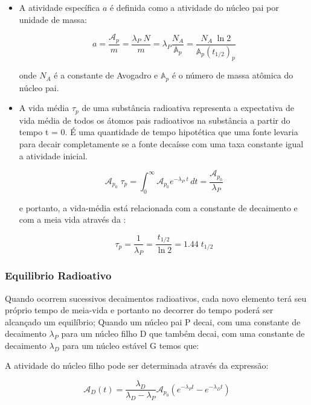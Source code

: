 \documentclass[11pt,a4paper]{article}
\begin{document}
\begin{itemize}
		\item A atividade específica $a$ é definida como a atividade do núcleo pai por unidade de massa:
		
			\begin{equation}
				a = \frac{\mathcal{A}_p}{m} = \frac{\lambda_P \; N}{m} = 
				\lambda_P \frac{N_A}{\mathbb{A}_p} = \frac{N_A \; \ln 2}{\mathbb{A}_p (t_{1/2})_p}
			\end{equation}
		
			onde $N_A$ é a constante de Avogadro e $\mathbb{A}_p$ é o número de massa atômica do núcleo pai.
		
		\item A vida média $\tau_p$ de uma substância radioativa representa a expectativa de vida média de todos os átomos pais radioativos na substância a partir do tempo t = 0. É uma quantidade de tempo hipotética que uma fonte levaria para decair completamente se a fonte decaísse com uma taxa constante igual a atividade inicial.
		
			\begin{equation}
				\mathcal{A}_{p_0} \; \tau_p = 
				\int_{0}^{\infty} \mathcal{A}_{p_0} e^{-\lambda_P \; t} \,dt = 
				\frac{\mathcal{A}_{p_0}}{\lambda_P}
			\end{equation}

		e portanto, a vida-média está relacionada com a constante de decaimento e com a meia vida através da :

			\begin{equation}
				\tau_p = \frac{1}{\lambda_P} = \frac{t_{1/2}}{\ln 2} = 1.44 \; t_{1/2}
			\end{equation}
	\end{itemize}        

\subsubsection*{Equilibrio Radioativo}

    Quando ocorrem sucessivos decaimentos radioativos, cada novo elemento terá seu próprio tempo de meia-vida e portanto no decorrer do tempo poderá ser alcançado um equilíbrio; Quando um núcleo pai P decai, com uma constante de decaimento $\lambda_P$ para um núcleo filho D que também decai, com uma constante de decaimento $\lambda_D$ para um núcleo estável G temos que: 
                
    \noindent A atividade do núcleo filho pode ser determinada através da expressão:

                \begin{equation}
                    \mathcal{A}_D(t) = \frac{\lambda_D}{\lambda_D - \lambda_P} \mathcal{A}_{p_0}\left(e^{-\lambda_P t} - e^{-\lambda_D t}\right)
                \end{equation}
\end{document}
